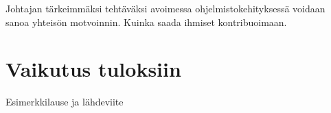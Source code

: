 \documentclass[finnish]{tktltiki2}
\theoremstyle{definition}
\theoremstyle{remark}
\begin{document}
Johtajan tärkeimmäksi tehtäväksi avoimessa ohjelmistokehityksessä  voidaan sanoa yhteisön motvoinnin. Kuinka saada ihmiset kontribuoimaan.


\section{Vaikutus tuloksiin}
Esimerkkilause ja lähdeviite~\cite{McLeod:2011:FAS:1978802.1978803}



%
%
% 
%



\end{document}
